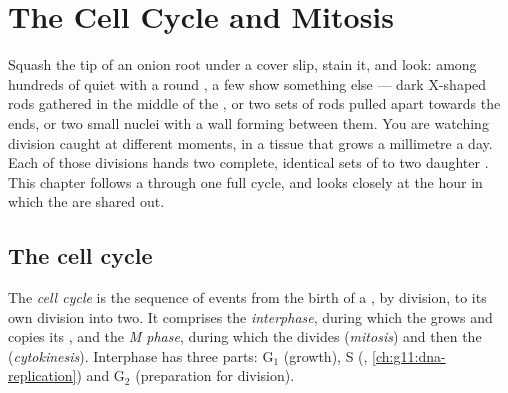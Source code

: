 \chapter{The Cell Cycle and Mitosis}\label{ch:g11:cell-cycle-mitosis}

Squash the tip of an onion root under a cover slip, stain it, and look:
among hundreds of quiet  with a round , a few show something
else --- dark X-shaped rods gathered in the middle of the , or two
sets of rods pulled apart towards the ends, or two small nuclei with a
wall forming between them. You are watching  division caught at
different moments, in a tissue that grows a millimetre a day. Each of
those divisions hands two complete, identical sets of  to two
daughter . This chapter follows a  through one full cycle, and
looks closely at the hour in which the  are shared out.

\section{The cell cycle}

\begin{definition}\label{def:g11:cell-cycle-mitosis:cycle}
The \emph{cell cycle} is the sequence of events from
the birth of a , by division, to its own division into two. It
comprises the \emph{interphase}, during which the  grows and
copies its , and the \emph{M phase}, during which the 
divides (\emph{mitosis}) and then the 
(\emph{cytokinesis}). Interphase has three parts: $\mathrm{G_1}$
(growth), S (, \cref{ch:g11:dna-replication}) and
$\mathrm{G_2}$ (preparation for division).
\end{definition}

